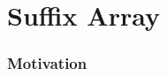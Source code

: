 \documentclass{beamer}
\begin{document}
\section{Suffix Array}

\begin{frame}[fragile]
\frametitle{Motivation}
\end{frame}

\end{document}
